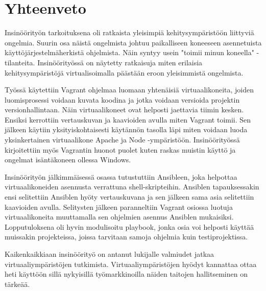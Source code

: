\chapter{Yhteenveto}

Insinöörityön tarkoituksena oli ratkaista yleisimpiä kehitysympäristöön liittyviä ongelmia. Suurin osa näistä ongelmista johtuu paikalliseen koneeseen asennetuista käyttöjärjestelmäherkistä ohjelmista. Näin syntyy usein "toimii minun koneella" -tilanteita. Insinöörityössä on näytetty ratkaisuja miten erilaisia kehitysympäristöjä virtualisoimalla päästään eroon yleisimmistä ongelmista.

Työssä käytettiin Vagrant ohjelmaa luomaan yhtenäisiä virtuaalikoneita, joiden luomisprosessi voidaan kuvata koodina ja jotka voidaan versioida projektin versionhallintaan. Näin virtuaalikoneet ovat helposti jaettavia tiimin kesken. Ensiksi kerrottiin vertauskuvan ja kaavioiden avulla miten Vagrant toimii. Sen jälkeen käytiin yksityiskohtaisesti käytännön tasolla läpi miten voidaan luoda yksinkertainen virtuaalikone Apache ja Node -ympäristöön. Insinöörityössä kirjoitettiin myös Vagrantin huonot puolet kuten raskas muistin käyttö ja ongelmat isäntäkoneen ollessa Windows.

Insinöörityön jälkimmäisessä osassa tutustuttiin Ansibleen, joka helpottaa virtuaalikoneiden asennusta verrattuna shell-skripteihin. Ansiblen tapauksessakin ensi selitettiin Ansiblen hyöty vertauskuvana ja sen jälkeen sama asia selitettiin kaavioiden avulla. Selitysten jälkeen paranneltiin Vagrant osiossa luotuja virtuaalikoneita muuttamalla sen ohjelmien asennus Ansiblen mukaisiksi. Lopputuloksena oli  hyvin modulisoitu playbook, jonka osia voi helposti käyttää muissakin projekteissa, joissa tarvitaan samoja ohjelmia kuin testiprojektissa.

Kaikenkaikkiaan insinöörityö on antanut lukijalle valmiudet jatkaa virtuaaliympäristöjen tutkimista. Virtuaaliympäristöjen hyödyt kannattaa ottaa heti käyttöön sillä nykyisillä työmarkkinoilla näiden taitojen hallitseminen on tärkeää.